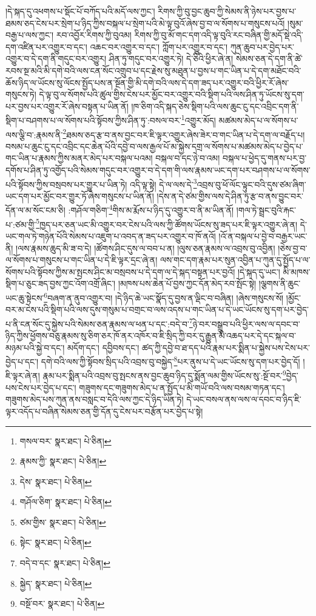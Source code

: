 །དེ་སྐད་དུ་འཕགས་པ་སྡོང་པོ་བཀོད་པའི་མདོ་ལས་ཀྱང་། རིགས་ཀྱི་བུ་བྱང་ཆུབ་ཀྱི་སེམས་ནི་ཉེས་པར་བྱས་པ་ཐམས་ཅད་ངེས་པར་སྲེག་པ་ཉིད་ཀྱིས་བསྐལ་པ་སྲེག་པའི་མེ་ལྟ་བུའོ་ཞེས་བྱ་བ་ལ་སོགས་པ་གསུངས་པའོ། །སུམ་བརྒྱ་པ་ལས་ཀྱང་། རབ་འབྱོར་རིགས་ཀྱི་བུའམ། རིགས་ཀྱི་བུ་མོ་གང་དག་འདི་ལྟ་བུའི་རང་བཞིན་གྱི་མདོ་སྡེ་འདི་དག་འཛིན་པར་འགྱུར་བ་དང་། འཆང་བར་འགྱུར་བ་དང་། ཀློག་པར་འགྱུར་བ་དང་། ཀུན་ཆུབ་པར་བྱེད་པར་འགྱུར་བ་དེ་དག་ནི་གདུང་བར་འགྱུར། ཤིན་ཏུ་གདུང་བར་འགྱུར་ཏེ། དེ་ཅིའི་ཕྱིར་ཞེ་ན། སེམས་ཅན་དེ་དག་ནི་ཚེ་རབས་སྔ་མའི་མི་དགེ་བའི་ལས་ངན་སོང་འགྲུབ་པ་དང་རྗེས་སུ་མཐུན་པ་བྱས་པ་གང་ཡིན་པ་དེ་དག་མཐོང་བའི་ཆོས་ཉིད་ལ་ཡོངས་སུ་ལོངས་སྤྱོད་པས་ན་སྔོན་གྱི་མི་དགེ་བའི་ལས་དེ་དག་ཟད་པར་འགྱུར་བའི་ཕྱིར་རོ་ཞེས་གསུངས་ཏེ། དེ་ལྟ་བུ་ལ་སོགས་པའི་ཚུལ་གྱིས་ངེས་པར་མྱོང་བར་འགྱུར་བའི་སྡིག་པའི་ལས་ཤིན་ཏུ་ཡོངས་སུ་དག་པར་བྱས་པར་འགྱུར་རོ་ཞེས་བསྟན་པ་ཡིན་ནོ། །ཁ་ཅིག་འདི་སྐད་ཅེས་སྡིག་པའི་ལས་ཆུང་ངུ་དང་འབྲིང་དག་ནི་སྡིག་པ་བཤགས་པ་ལ་སོགས་པའི་སྟོབས་ཀྱིས་ཤིན་ཏུ་:བསལ་བར་\footnote{གསལ་བར་  སྣར་ཐང་།  པེ་ཅིན། }འགྱུར་མོད། མཚམས་མེད་པ་ལ་སོགས་པ་ལས་ལྕི་བ་:རྣམས་ནི་\footnote{རྣམས་ཀྱི་  སྣར་ཐང་།  པེ་ཅིན། }ཐམས་ཅད་རྩ་བ་ནས་བྱང་བར་ཇི་ལྟར་འགྱུར་ཞེས་ཟེར་བ་གང་ཡིན་པ་དེ་དག་ལ་བརྗོད་པ། བསམ་པ་ཆུང་ངུ་དང་འབྲིང་དང་ཆེན་པོའི་དབྱེ་བ་ལས་རྒྱལ་པོ་མ་སྐྱེས་དགྲ་ལ་སོགས་པ་མཚམས་མེད་པ་བྱེད་པ་གང་ཡིན་པ་རྣམས་ཀྱིས་མནར་མེད་པར་བསྐལ་པའམ། བསྐལ་བ་དང་ཉེ་བ་འམ། བསྐལ་པ་ཕྱེད་དུ་གནས་པར་བྱ་དགོས་པ་ཤིན་ཏུ་འགྱོད་པའི་སེམས་གདུང་བར་འགྱུར་བ་དེ་དག་གི་ལས་རྣམས་ཡང་དག་པར་བཤགས་པ་ལ་སོགས་པའི་སྟོབས་ཀྱིས་བསྲབས་པར་གྱུར་པ་ཡིན་ཏེ། འདི་ལྟ་སྟེ། དེ་ལ་ལས་དེ་\footnote{དེས་  སྣར་ཐང་།  པེ་ཅིན། }འབྲས་བུ་ཕོ་ལོང་ལྟུང་བའི་དུས་ཙམ་ཞིག་ཡང་དག་པར་མྱོང་བར་གྱུར་ཏོ་ཞེས་གསུངས་པ་ཡིན་ནོ། །དེས་ན་དེ་ཙམ་གྱིས་ལས་དེ་ཤིན་ཏུ་རྩ་བ་ནས་བྱུང་བར་དོན་ལ་མ་སོང་ངམ་ཅི། :གཤོལ་གཅིག་\footnote{གཤོལ་ཅིག་  སྣར་ཐང་།  པེ་ཅིན། }གིས་མ་རྨོས་པ་ཉིད་དུ་འགྱུར་བ་ནི་མ་ཡིན་ནོ། །གལ་ཏེ་སྦྲང་བུའི་རྐང་པ་:ཙམ་གྱི་\footnote{ཙམ་གྱིས་  སྣར་ཐང་།  པེ་ཅིན། }ཁྱད་པར་ཅན་ཡང་མི་འགྱུར་བར་ངེས་པའི་ལས་ཀྱི་ཚོགས་ཡོངས་སུ་ཟད་པར་ཇི་ལྟར་འགྱུར་ཞེ་ན། དེ་ཡང་གལ་ཏེ་གཉེན་པོའི་སེམས་པ་འཇུག་པ་འབད་ན་ཟད་པར་འགྱུར་བ་ཁོ་ནའོ། །འོ་ན་བསྐལ་པ་བྱེ་བ་བརྒྱར་ཡང་ནི། །ལས་རྣམས་ཆུད་མི་ཟ་བ་དེ། །ཚོགས་ཤིང་དུས་ལ་བབ་པ་ན། །ལུས་ཅན་རྣམས་ལ་འབྲས་བུ་འབྱིན། །ཅེས་བྱ་བ་ལ་སོགས་པ་གསུངས་པ་གང་ཡིན་པ་དེ་ཇི་ལྟར་དྲང་ཞེ་ན། ལས་གང་དག་རྣམ་པར་སུན་འབྱིན་པ་ཀུན་དུ་སྤྱོད་པ་ལ་སོགས་པའི་སྟོབས་ཀྱིས་མ་སྤངས་ཤིང་མ་བསྲབས་པ་དེ་དག་ལ་དེ་སྐད་བསྟན་པར་བྱའོ། །དེ་སྐད་དུ་ཡང་། མི་མཁས་སྡིག་པ་ཅུང་ཟད་བྱས་ཀྱང་འོག་འགྲོ་ཞིང་། །མཁས་པས་ཆེན་པོ་བྱས་ཀྱང་དོན་མེད་རབ་སྤོང་སྟེ། །ལྕགས་ནི་ཆུང་ཡང་ཆུ་སྟེངས་\footnote{སྟེང་  སྣར་ཐང་།  པེ་ཅིན། }བཞག་ན་ནུབ་འགྱུར་བ། །དེ་ཉིད་ཆེ་ཡང་སྣོད་དུ་བྱས་ན་ལྡིང་བ་བཞིན། །ཞེས་གསུངས་སོ། །མྱོང་བར་མ་ངེས་པའི་སྡིག་པའི་ལས་དུས་གསུམ་པ་བགྲང་བ་ལས་འདས་པ་གང་ཡིན་པ་དེ་ཡང་ཡོངས་སུ་དག་པར་བྱེད་པ་ནི་ངན་སོང་དུ་སྐྱེས་པའི་སེམས་ཅན་རྣམས་ལ་ཕན་པ་དང་:བདེ་བ་\footnote{བདེ་བ་དང་  སྣར་ཐང་།  པེ་ཅིན། }ཉེ་བར་བསྒྲུབ་པའི་ཕྱིར་ལས་ལ་དབང་བ་ཉིད་ཀྱིས་ཕྱོགས་བཅུ་རྣམས་སུ་ཅིག་ཅར་ཁོ་ནར་འཁོར་བ་ཇི་སྲིད་ཀྱི་བར་དུ་རྒྱུན་མི་འཆད་པར་དེ་དང་སྐལ་བ་མཉམ་པའི་སྐྱེ་བ་དང་། མདོག་དང་། དབྱིབས་དང་། ཚད་ཀྱི་དབྱེ་བ་ཐ་དད་པའི་རྣམ་པར་སྨིན་པ་སྐྱེས་པས་ངེས་པར་བྱེད་པ་དང་། དགེ་བའི་ལས་ཀྱི་སྟོབས་སྲིད་པའི་འབྲས་བུ་བསྐྱེད་\footnote{སྐྱེད་  སྣར་ཐང་།  པེ་ཅིན། }པར་ནུས་པ་དེ་ཡང་ཡོངས་སུ་དག་པར་བྱེད་དོ། །ཇི་ལྟར་ཞེ་ན། རྣམ་པར་སྨིན་པའི་འབྲས་བུ་སྤངས་ནས་བྱང་ཆུབ་ཉིད་དུ་སྨོན་ལམ་གྱིས་ཡོངས་སུ་:སྔོ་བར་\footnote{བསྔོ་བར་  སྣར་ཐང་།  པེ་ཅིན། }བྱེད་པས་ངེས་པར་བྱེད་པ་དང་། གཟུགས་དང་གཟུགས་མེད་པ་ན་སྤྱོད་པ་མི་གཡོ་བའི་ལས་བསམ་གཏན་དང་། གཟུགས་མེད་པས་ཀུན་ནས་བསླང་བ་དེའི་ལས་ཀྱང་དེ་ཉིད་ཡིན་ཏེ། དེ་ཡང་བསལ་ནས་ལས་ལ་དབང་བ་ཉིད་ཇི་ལྟར་འདོད་པ་བཞིན་སེམས་ཅན་གྱི་དོན་དུ་ངེས་པར་བརྩོན་པར་བྱེད་པ་སྟེ། 